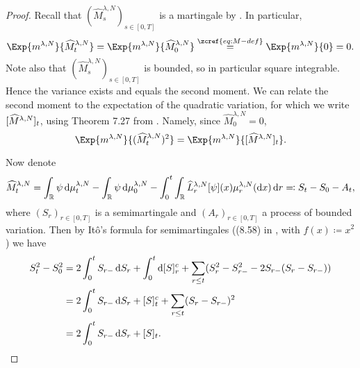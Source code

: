 \begin{proof}
  Recall that \((\widehat{M}_s^{\lambda,N})_{s\in[0,T]}\) is a martingale by .
  In particular,
  \begin{equation}
    \Exp{\lawmu^{\lambda,N}}{\widehat{M}_t^{\lambda,N}} = \Exp{\lawmu^{\lambda,N}}{\widehat{M}_0^{\lambda,N}}
    \overset{\zcref{eq:M-def}}{=} \Exp{\lawmu^{\lambda,N}}{0} = 0.
  \end{equation}
  Note also that \((\widehat{M}_s^{\lambda,N})_{s\in[0,T]}\) is bounded, so in particular square integrable.
  Hence the variance exists and equals the second moment.
  We can relate the second moment to the expectation of the quadratic variation, for which we write \([\widehat{M}^{\lambda,N}]_t\), using Theorem 7.27 from \cite[201]{klebanerIntroductionStochasticCalculus2012}.
  Namely, since \(\widehat{M}_0^{\lambda,N} = 0\),
  \begin{equation}
    \Exp{\lawmu^{\lambda,N}}{(\widehat{M}_t^{\lambda,N})^2} = \Exp{\lawmu^{\lambda,N}}{\sbr{\widehat{M}^{\lambda,N}}_t}.
  \end{equation}

  Now denote
  \begin{equation}\label{eq:M=S-A}
    \widehat{M}_t^{\lambda,N} = \int_\potspace \psi \odif{\mu_t^{\lambda, N}} - \int_\potspace \psi \odif{\mu_0^{\lambda, N}} - \int_0^t \int_\potspace \widehat{L}_r^{\lambda, N} [\psi](x) \mu_{r}^{\lambda, N}(\odif{x}) \odif{r}
    \eqqcolon S_t - S_0 - A_t,
  \end{equation}
  where \((S_r)_{r\in[0,T]}\) is a semimartingale and \((A_r)_{r\in[0,T]}\) a process of bounded variation.
  Then by Itô's formula for semimartingales ((8.58) in \cite[236]{klebanerIntroductionStochasticCalculus2012}, with \(f(x) \coloneqq x^2\)) we have
  \begin{equation}\label{eq:S^2-q-var-rel}
    \begin{split}
      S_t^2 - S_0^2
       & = 2 \int_0^t S_{r-} \odif{S_r} + \int_0^t \odif{\sbr{S}_r^c}
      + \sum_{r \leq t} \br{ S_r^2 - S_{r-}^2  - 2 S_{r-} (S_r - S_{r-}) } \\
       & = 2 \int_0^t S_{r-} \odif{S_r} + \sbr{S}_t^c
      + \sum_{r \leq t} \br{ S_r - S_{r-} }^2                              \\
       & = 2 \int_0^t S_{r-} \odif{S_r} + \sbr{S}_t.
    \end{split}
  \end{equation}


\end{proof}

